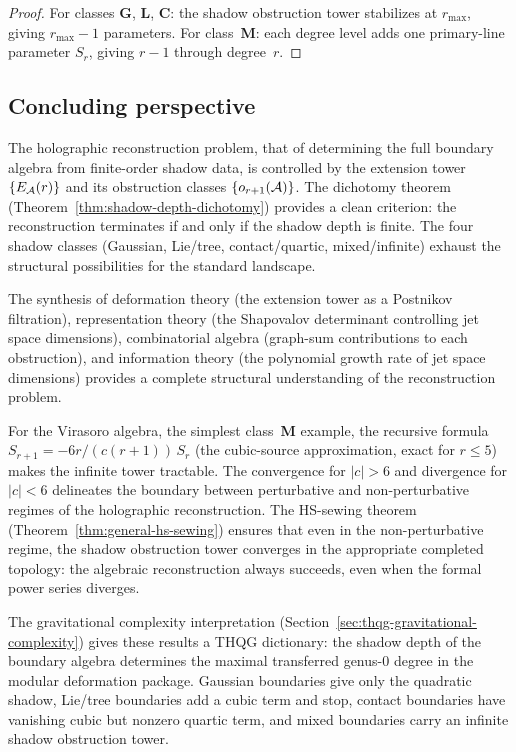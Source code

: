\begin{proof}
For classes \textbf{G}, \textbf{L}, \textbf{C}: the
shadow obstruction tower stabilizes at $r_{\max}$, giving
$r_{\max} - 1$ parameters.
For class~\textbf{M}: each degree level adds one
primary-line parameter $S_r$, giving $r - 1$ through
degree~$r$.
\end{proof}


\subsection{Concluding perspective}
\label{subsec:reconstruction-conclusion}

The holographic reconstruction problem, that of determining the
full boundary algebra from finite-order shadow data, is
controlled by the extension tower $\{E_{\mathcal{A}}(r)\}$ and its
obstruction classes $\{o_{r+1}(\mathcal{A})\}$. The dichotomy
theorem (Theorem~\ref{thm:shadow-depth-dichotomy})
provides a clean criterion: the reconstruction terminates
if and only if the shadow depth is finite. The four
shadow classes (Gaussian, Lie/tree, contact/quartic,
mixed/infinite) exhaust the structural possibilities
for the standard landscape.

The synthesis of deformation theory (the extension tower
as a Postnikov filtration), representation theory (the
Shapovalov determinant controlling jet space dimensions),
combinatorial algebra (graph-sum contributions to each
obstruction), and information theory (the polynomial
growth rate of jet space dimensions) provides a complete
structural understanding of the reconstruction problem.

For the Virasoro algebra, the simplest class~\textbf{M}
example, the recursive formula
$S_{r+1} = -6r/(c(r+1))\,S_r$
\textup{(}the cubic-source approximation, exact for
$r \leq 5$\textup{)} makes the infinite tower
tractable. The convergence for $|c| > 6$ and
divergence for $|c| < 6$ delineates the boundary
between perturbative and non-perturbative regimes of
the holographic reconstruction. The HS-sewing theorem
(Theorem~\ref{thm:general-hs-sewing}) ensures that
even in the non-perturbative regime, the shadow obstruction tower
converges in the appropriate completed topology: the
algebraic reconstruction always succeeds, even when the
formal power series diverges.

The gravitational complexity interpretation
(Section~\ref{sec:thqg-gravitational-complexity}) gives
these results a THQG dictionary: the shadow depth of the
boundary algebra determines the maximal transferred genus-$0$
degree in the modular deformation package. Gaussian
boundaries give only the quadratic shadow, Lie/tree
boundaries add a cubic term and stop, contact boundaries
have vanishing cubic but nonzero quartic term, and mixed
boundaries carry an infinite shadow obstruction tower.
